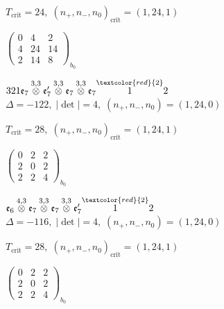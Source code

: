 \documentclass[10pt]{article}
\begin{document}
\hspace{1em}$T_{\text{crit}}=24,\; (n_+,n_-,n_0)_{\text{crit}}=(1,24,1)$

\hspace{2em}$\left(\begin{smallmatrix}0 & 4 & 2 \\ 4 & 24 & 14 \\ 2 & 14 & 8\end{smallmatrix}\right)_{\!b_0}$

\smallskip

$321\mathfrak{e}_7\overset{3,3}{\otimes}\mathfrak{e}_7'\overset{3,3}{\otimes}\mathfrak{e}_7\overset{3,3}{\otimes}\mathfrak{e}_7\overset{\textcolor{red}{2}}{1}2$ \quad $\Delta=-122,\; |\det|=4,\; (n_+,n_-,n_0)=(1,24,0)$

\hspace{1em}$T_{\text{crit}}=28,\; (n_+,n_-,n_0)_{\text{crit}}=(1,24,1)$

\hspace{2em}$\left(\begin{smallmatrix}0 & 2 & 2 \\ 2 & 0 & 2 \\ 2 & 2 & 4\end{smallmatrix}\right)_{\!b_0}$

\smallskip

$\mathfrak{e}_6\overset{4,3}{\otimes}\mathfrak{e}_7\overset{3,3}{\otimes}\mathfrak{e}_7\overset{3,3}{\otimes}\mathfrak{e}_7'\overset{\textcolor{red}{2}}{1}2$ \quad $\Delta=-116,\; |\det|=4,\; (n_+,n_-,n_0)=(1,24,0)$

\hspace{1em}$T_{\text{crit}}=28,\; (n_+,n_-,n_0)_{\text{crit}}=(1,24,1)$

\hspace{2em}$\left(\begin{smallmatrix}0 & 2 & 2 \\ 2 & 0 & 2 \\ 2 & 2 & 4\end{smallmatrix}\right)_{\!b_0}$

\smallskip
\end{document}
